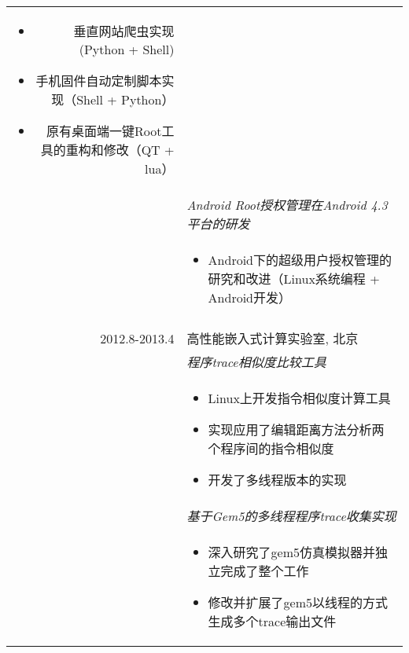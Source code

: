 \documentclass[a4paper,10pt]{article} %
\begin{document}
\begin{tabular}{r|p{11cm}}
{\begin{itemize}
\item 垂直网站爬虫实现(Python + Shell)
\item 手机固件自动定制脚本实现（Shell + Python）
\item 原有桌面端一键Root工具的重构和修改（QT + lua）
\end{itemize}
}\smallskip \\
& \emph{Android Root授权管理在Android 4.3平台的研发}\smallskip\\
& \footnotesize{
\begin{itemize}
\item Android下的超级用户授权管理的研究和改进（Linux系统编程 + Android开发）
\end{itemize}  
}\\
\multicolumn{2}{c}{} \\
\textsc{2012.8-2013.4} &  \textsc{高性能嵌入式计算实验室}, 北京 \smallskip\smallskip\\
& \emph{程序trace相似度比较工具}\\ 
& \footnotesize{
\begin{itemize}
\item Linux上开发指令相似度计算工具
\item 实现应用了编辑距离方法分析两个程序间的指令相似度
\item 开发了多线程版本的实现
\end{itemize}
}\smallskip\\
& \emph{基于Gem5的多线程程序trace收集实现}\smallskip\\
& \footnotesize{
\begin{itemize}
\item 深入研究了gem5仿真模拟器并独立完成了整个工作
\item 修改并扩展了gem5以线程的方式生成多个trace输出文件
\end{itemize}
}\smallskip\\

\end{tabular}
\pagebreak
\end{document}
